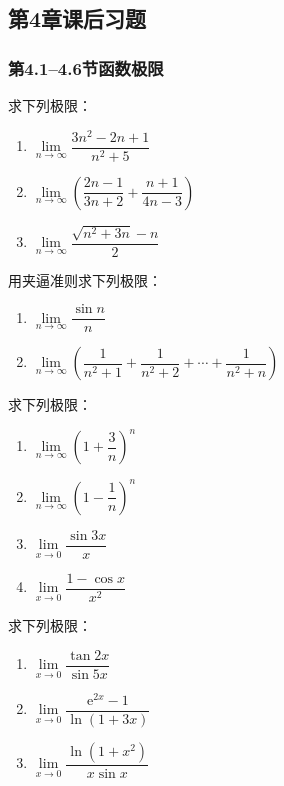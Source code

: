 \documentclass[fontset=fandol]{ctexart}
\newcommand{\ee}{\mathrm{e}}
\begin{document}
\iffalse

\subsection*{第4章课后习题}

\subsubsection*{第4.1--4.6节\quad 函数极限}

\begin{exercise}求下列极限：
\begin{enumerate}
\item \(\lim\limits_{n\to\infty} \dfrac{3n^2 - 2n + 1}{n^2 + 5}\)
\item \(\lim\limits_{n\to\infty} \left(\dfrac{2n-1}{3n+2} + \dfrac{n+1}{4n-3}\right)\)
\item \(\lim\limits_{n\to\infty} \dfrac{\sqrt{n^2 + 3n} - n}{2}\)
\end{enumerate}
\end{exercise}

\begin{exercise}用夹逼准则求下列极限：
\begin{enumerate}
\item \(\lim\limits_{n\to\infty} \dfrac{\sin n}{n}\)
\item \(\lim\limits_{n\to\infty} \left(\dfrac{1}{n^2+1} + \dfrac{1}{n^2+2} + \cdots + \dfrac{1}{n^2+n}\right)\)
\end{enumerate}
\end{exercise}

\begin{exercise}求下列极限：
\begin{enumerate}
\item \(\lim\limits_{n\to\infty} \left(1 + \dfrac{3}{n}\right)^n\)
\item \(\lim\limits_{n\to\infty} \left(1 - \dfrac{1}{n}\right)^n\)
\item \(\lim\limits_{x\to 0} \dfrac{\sin 3x}{x}\)
\item \(\lim\limits_{x\to 0} \dfrac{1 - \cos x}{x^2}\)
\end{enumerate}
\end{exercise}

\begin{exercise}求下列极限：
\begin{enumerate}
\item \(\lim\limits_{x\to 0} \dfrac{\tan 2x}{\sin 5x}\)
\item \(\lim\limits_{x\to 0} \dfrac{\ee^{2x} - 1}{\ln(1+3x)}\)
\item \(\lim\limits_{x\to 0} \dfrac{\ln(1 + x^2)}{x \sin x}\)
\end{enumerate}
\end{exercise}
\end{document}
